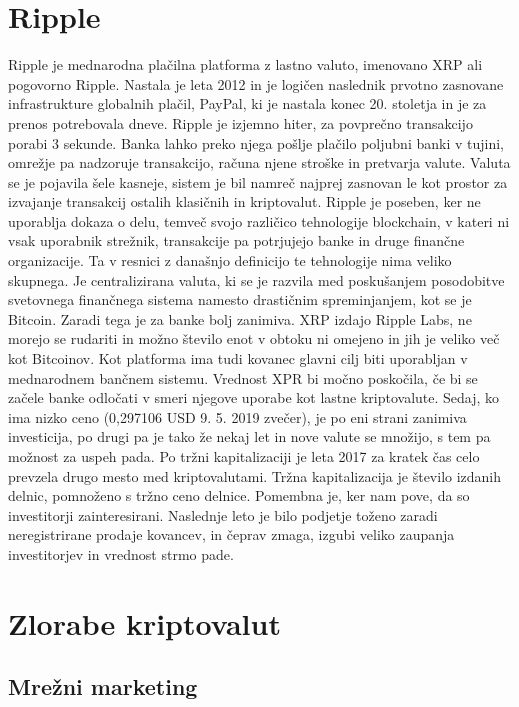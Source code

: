 \documentclass[letterpaper, titlepage, freqn]{article}
\begin{document}
\section{Ripple}

Ripple je mednarodna plačilna platforma z lastno valuto, imenovano XRP ali pogovorno Ripple. Nastala je leta 2012 in je logičen naslednik prvotno zasnovane infrastrukture globalnih plačil, PayPal, ki je nastala konec 20. stoletja in je za prenos potrebovala dneve. Ripple je izjemno hiter, za povprečno transakcijo porabi 3 sekunde. Banka lahko preko njega pošlje plačilo poljubni banki v tujini, omrežje pa nadzoruje transakcijo, računa njene stroške in pretvarja valute. Valuta se je pojavila šele kasneje, sistem je bil namreč najprej zasnovan le kot prostor za izvajanje transakcij ostalih klasičnih in kriptovalut. Ripple je poseben, ker ne uporablja dokaza o delu, temveč svojo različico tehnologije blockchain, v kateri ni vsak uporabnik strežnik, transakcije pa potrjujejo banke in druge finančne organizacije. Ta v resnici z današnjo definicijo te tehnologije nima veliko skupnega. Je centralizirana valuta, ki se je razvila med poskušanjem posodobitve svetovnega finančnega sistema namesto drastičnim spreminjanjem, kot se je Bitcoin. Zaradi tega je za banke bolj zanimiva. XRP izdajo Ripple Labs, ne morejo se rudariti in možno število enot v obtoku ni omejeno in jih je veliko več kot Bitcoinov. Kot platforma ima tudi kovanec glavni cilj biti uporabljan v mednarodnem bančnem sistemu. Vrednost XPR bi močno poskočila, če bi se začele banke odločati v smeri njegove uporabe kot lastne kriptovalute. Sedaj, ko ima nizko ceno (0,297106 USD 9. 5. 2019 zvečer), je po eni strani zanimiva investicija, po drugi pa je tako že nekaj let in nove valute se množijo, s tem pa možnost za uspeh pada. Po tržni kapitalizaciji je leta 2017 za kratek čas celo prevzela drugo mesto med kriptovalutami. Tržna kapitalizacija je število izdanih delnic, pomnoženo s tržno ceno delnice. Pomembna je, ker nam pove, da so investitorji zainteresirani. Naslednje leto je bilo podjetje toženo zaradi neregistrirane prodaje kovancev, in čeprav zmaga, izgubi veliko zaupanja investitorjev in vrednost strmo pade.\\

\section{Zlorabe kriptovalut}

\subsection{Mrežni marketing}
\end{document}
